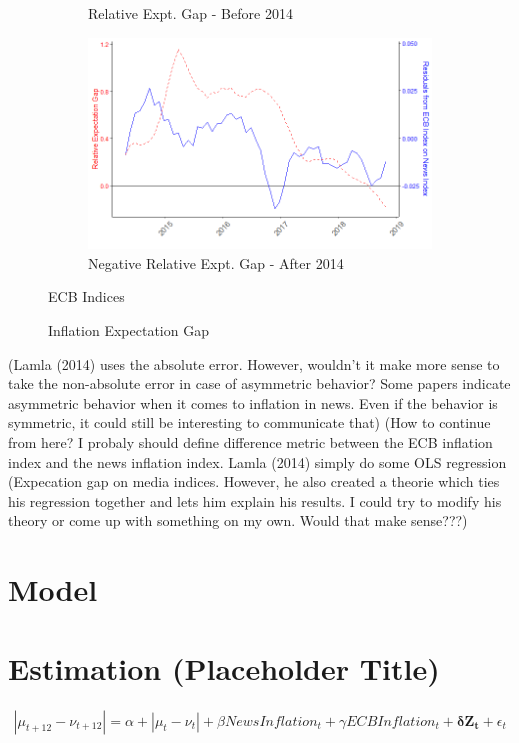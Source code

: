 \documentclass[review]{elsarticle}
\begin{document}
\begin{figure}[h!]
\begin{subfigure}{6cm}
    \caption{Relative Expt. Gap - Before 2014}
    \label{ECB_inf}
\end{subfigure}
\hfil
\begin{subfigure}{6cm}
    \includegraphics{rel_exp_res_aft2014.png}
    \caption{Negative Relative Expt. Gap - After 2014}
    \label{ECB_inf}
\end{subfigure}
\caption{ECB Indices}
\caption{Inflation Expectation Gap}
\label{fig:Expectation Gap}
    \end{figure}


(Lamla (2014) uses the absolute error. However, wouldn't it make more sense to take the non-absolute error in case of asymmetric behavior? Some papers indicate asymmetric behavior when it comes to inflation in news. Even if the behavior is symmetric, it could still be interesting to communicate that)
(How to continue from here? I probaly should define difference metric between the ECB inflation index and the news inflation index. Lamla (2014) simply do some OLS regression (Expecation gap on media indices. However, he also created a theorie which ties his regression together and lets him explain his results. I could try to modify his theory or come up with something on my own. Would that make sense???)

\section{Model}\label{sec:Model}

\section{Estimation (Placeholder Title)}\label{sec:Estimation}

\begin{align}
|\mu_{t+12} - \nu_{t+12}| = \alpha + |\mu_t - \nu_t| + \beta NewsInflation_t + \gamma ECBInflation_t + \mathbf{\delta} \mathbf{Z_t} + \epsilon_t
\end{align}
\end{document}
